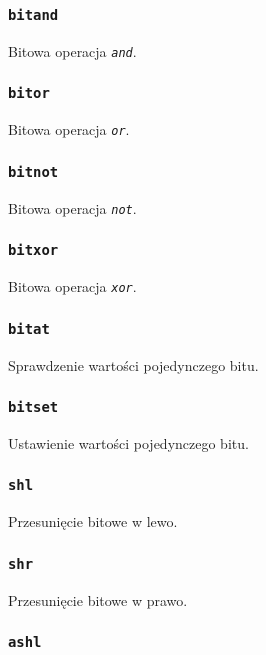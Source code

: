 \subsubsection{\texttt{bitand}}

Bitowa operacja \emph{\texttt{and}}.

\subsubsection{\texttt{bitor}}

Bitowa operacja \emph{\texttt{or}}.

\subsubsection{\texttt{bitnot}}

Bitowa operacja \emph{\texttt{not}}.

\subsubsection{\texttt{bitxor}}

Bitowa operacja \emph{\texttt{xor}}.

\subsubsection{\texttt{bitat}}

Sprawdzenie wartości pojedynczego bitu.

\subsubsection{\texttt{bitset}}

Ustawienie wartości pojedynczego bitu.

\subsubsection{\texttt{shl}}

Przesunięcie bitowe w lewo.

\subsubsection{\texttt{shr}}

Przesunięcie bitowe w prawo.

\subsubsection{\texttt{ashl}}

